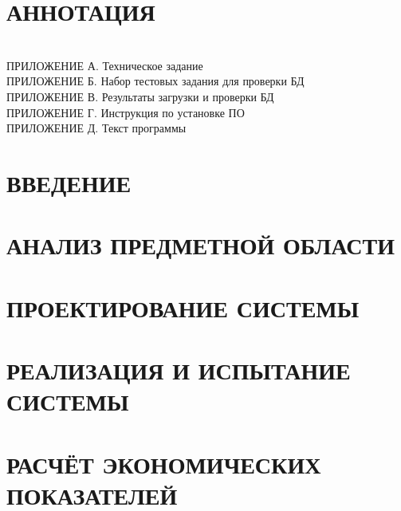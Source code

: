 

\newpage
\section*{АННОТАЦИЯ}


\newpage
{}
\tableofcontents
\hspace{0pt}\\
ПРИЛОЖЕНИЕ А. Техническое задание \\
ПРИЛОЖЕНИЕ Б. Набор тестовых задания для проверки БД \\
ПРИЛОЖЕНИЕ В. Результаты загрузки и проверки БД \\
ПРИЛОЖЕНИЕ Г. Инструкция по установке ПО \\
ПРИЛОЖЕНИЕ Д. Текст программы \\

\newpage
{}
{}
\section*{ВВЕДЕНИЕ}


\section{АНАЛИЗ ПРЕДМЕТНОЙ ОБЛАСТИ}


\newpage
\section{ПРОЕКТИРОВАНИЕ СИСТЕМЫ}



% 
% 



\newpage
\section{РЕАЛИЗАЦИЯ И ИСПЫТАНИЕ СИСТЕМЫ}
% 


\newpage
\section{РАСЧЁТ ЭКОНОМИЧЕСКИХ ПОКАЗАТЕЛЕЙ}


